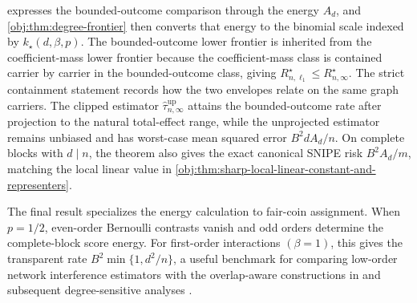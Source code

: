  expresses the bounded-outcome comparison through the energy \(A_d\), and \cref{obj:thm:degree-frontier} then converts that energy to the binomial scale indexed by \(k_\star(d,\beta,p)\). The bounded-outcome lower frontier is inherited from the coefficient-mass lower frontier because the coefficient-mass class is contained carrier by carrier in the bounded-outcome class, giving \(R_{n,\ell_1}^{\star}\le R_{n,\infty}^{\star}\). The strict containment statement records how the two envelopes relate on the same graph carriers. The clipped estimator \(\widehat\tau_{n,\infty}^{\mathrm{up}}\) attains the bounded-outcome rate after projection to the natural total-effect range, while the unprojected estimator remains unbiased and has worst-case mean squared error \(B^2dA_d/n\). On complete blocks with \(d\mid n\), the theorem also gives the exact canonical SNIPE risk \(B^2A_d/m\), matching the local linear value in \cref{obj:thm:sharp-local-linear-constant-and-representers}.

The final result specializes the energy calculation to fair-coin assignment. When \(p=1/2\), even-order Bernoulli contrasts vanish and odd orders determine the complete-block score energy. For first-order interactions \((\beta=1)\), this gives the transparent rate \(B^2\min\{1,d^2/n\}\), a useful benchmark for comparing low-order network interference estimators with the overlap-aware constructions in \citet{CortezRodriguezEichhornYu2023} and subsequent degree-sensitive analyses \citep{HarshawSavjeWang2025,EichhornKhanUganderYu2026,WangLi2026}.

